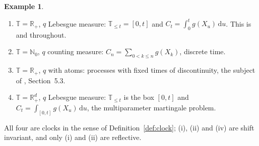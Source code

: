 \documentclass[11pt,a4paper]{article}
\theoremstyle{plain}
\theoremstyle{definition}
\newtheorem{example}[theorem]{Example}
\theoremstyle{remark}
\newcommand{\R}{\mathbb{R}}
\newcommand{\N}{\mathbb{N}}
\newcommand{\Rp}{\R_+}
\newcommand{\T}{\mathbb{T}}                     %
\newcommand{\dif}{\,\mathrm{d}}
\newcommand{\EK}{\cite{EK86}}
\newcommand{\CPS}{\cite{CPS23}}
\begin{document}
\begin{example}
  \label{ex:clocks}
  \begin{enumerate}[label=(\roman*),nosep]
  \item $\T = \Rp$, $q$ Lebesgue measure: $\T_{\leq t} = [0,t]$ and
    $C_t = \int_0^t g(X_u)\dif u$.  This is \EK{} and \CPS{} throughout.
  \item $\T = \N_0$, $q$ counting measure: $C_n = \sum_{0 < k \leq n} g(X_k)$,
    discrete time.
  \item $\T = \Rp$, $q$ with atoms: processes with fixed times of
    discontinuity, the subject of \CPS, Section~5.3.
  \item $\T = \Rp^d$, $q$ Lebesgue measure: $\T_{\leq t}$ is the box $[0,t]$ and
    $C_t = \int_{[0,t]} g(X_u)\dif u$, the multiparameter martingale problem.
  \end{enumerate}
  All four are clocks in the sense of Definition~\ref{def:clock}; (i), (ii) and
  (iv) are shift invariant, and only (i) and (ii) are reflective.
\end{example}
\end{document}
